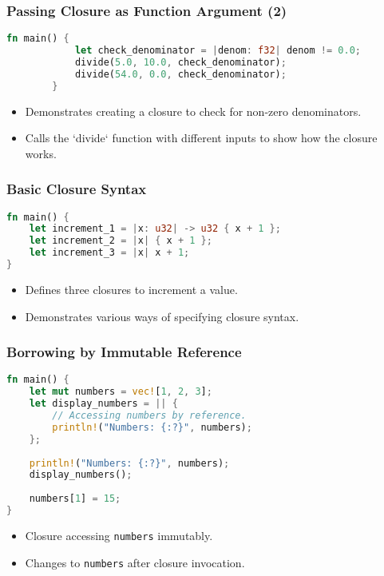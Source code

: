 \documentclass[aspectratio=169, table]{beamer}
\begin{document}
\begin{frame}[fragile]
	\frametitle{Passing Closure as Function Argument (2)}
	\begin{lstlisting}[language=Rust]
		fn main() {
			let check_denominator = |denom: f32| denom != 0.0;
			divide(5.0, 10.0, check_denominator);
			divide(54.0, 0.0, check_denominator);
		}
	\end{lstlisting}
	\begin{itemize}
		\item Demonstrates creating a closure to check for non-zero denominators.
		\item Calls the `divide` function with different inputs to show how the closure works.
	\end{itemize}
\end{frame}



\begin{frame}[fragile]
\frametitle{Basic Closure Syntax}
\begin{lstlisting}[language=Rust]
fn main() {
	let increment_1 = |x: u32| -> u32 { x + 1 };
	let increment_2 = |x| { x + 1 };
	let increment_3 = |x| x + 1;
}
\end{lstlisting}
\begin{itemize}
\item Defines three closures to increment a value.
\item Demonstrates various ways of specifying closure syntax.
\end{itemize}
\end{frame}

\begin{frame}[fragile]
\frametitle{Borrowing by Immutable Reference}
\vspace{15pt}
\begin{lstlisting}[language=Rust]
fn main() {
	let mut numbers = vec![1, 2, 3];
	let display_numbers = || {
		// Accessing numbers by reference.
		println!("Numbers: {:?}", numbers);
	};
	
	println!("Numbers: {:?}", numbers);
	display_numbers();
	
	numbers[1] = 15;
}
\end{lstlisting}
\begin{itemize}
\item Closure accessing \texttt{numbers} immutably.
\item Changes to \texttt{numbers} after closure invocation.
\end{itemize}
\end{frame}
\end{document}
